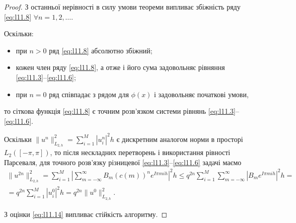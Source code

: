 \begin{proof}
    З останньої нерівності в силу умови теореми випливає збіжність ряду \eqref{eq:l11.8} $\forall n = 1,2,\ldots$. \medskip

	Оскільки: 
	\begin{itemize}
	    \item при $n > 0$ ряд \eqref{eq:l11.8} абсолютно збіжний; 
        \item кожен член ряду \eqref{eq:l11.8}, а отже і його сума задовольняє рівняння \eqref{eq:l11.3}--\eqref{eq:l11.6}; 
        \item при $n = 0$ ряд співпадає з рядом для $\phi(x)$ і задовольняє початкові умови, 
	\end{itemize}
    то сіткова функція \eqref{eq:l11.8} є точним розв'язком системи рівнянь \eqref{eq:l11.3}--\eqref{eq:l11.6}.  \medskip

	Оскільки $\|u^n\|_{L_{2,h}}^2 = \sum_{i=1}^M |u_i^n|^2 h$ є дискретним аналогом норми в просторі $L_2([-\pi,\pi])$, то після нескладних перетворень і використання рівності Парсеваля, для точного розв'язку різницевої \eqref{eq:l11.3}--\eqref{eq:l11.6} задачі маємо 
    \begin{multline}
	 	\label{eq:l11.14}
        \|u^{2n}\|_{L_{2,h}}^2 = \sum_{i=1}^M \left| \sum_{m=-\infty}^\infty B_m (c(m))^n e^{I\pi mih} \right|^2 h \le q^{2n} \sum_{i=1}^M \sum_{m=-\infty}^\infty \left|B_m e^{I\pi mih} \right|^2 h = \\ = q^{2n} \sum_{i=1}^M |u_i^0|^2 h = q^{2n} \|u^0\|_{L_{2,h}}^2.
    \end{multline}

    З оцінки \eqref{eq:l11.14} випливає стійкість алгоритму.
\end{proof}
